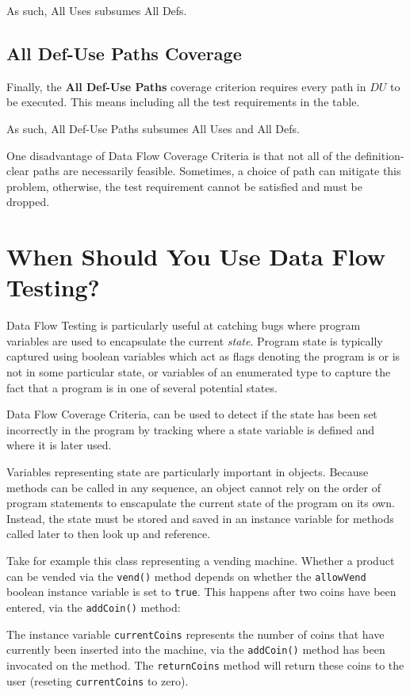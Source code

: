 As such, All Uses subsumes All Defs.

\subsection{All Def-Use Paths Coverage}

Finally, the {\bf All Def-Use Paths} coverage criterion requires every path in
$DU$ to be executed. This means including all the test requirements in the table.

As such, All Def-Use Paths subsumes All Uses and All Defs.

One disadvantage of Data Flow Coverage Criteria is that not all of the
definition-clear paths are necessarily feasible. Sometimes, a choice of path can
mitigate this problem, otherwise, the test requirement cannot be satisfied and
must be dropped.

\section{When Should You Use Data Flow Testing?}

Data Flow Testing is particularly useful at catching bugs where program
variables are used to encapsulate the current {\it state}. Program state is
typically captured using boolean variables which act as flags denoting the
program is or is not in some particular state, or variables of an enumerated
type to capture the fact that a program is in one of several potential states.

Data Flow Coverage Criteria, can be used to detect if the state has been set
incorrectly in the program by tracking where a state variable is defined and
where it is later used. 

Variables representing state are particularly important in objects. Because
methods can be called in any sequence, an object cannot rely on the order of
program statements to enscapulate the current state of the program on its own.
Instead, the state must be stored and saved in an instance variable for methods
called later to then look up and reference.

Take for example this class representing a vending machine. Whether a product
can be vended via the {\tt vend()} method depends on whether the {\tt allowVend}
boolean instance variable is set to {\tt true}. This happens after two coins
have been entered, via the {\tt addCoin()} method:


The instance variable {\tt currentCoins} represents the number of coins that
have currently been inserted into the machine, via the {\tt addCoin()} method
has been invocated on the method. The {\tt returnCoins} method will return these
coins to the user (reseting {\tt currentCoins} to zero).

